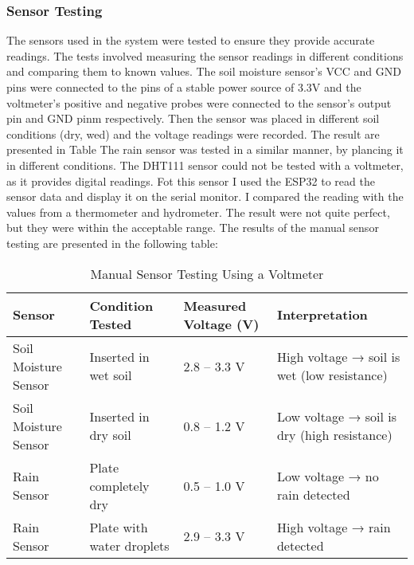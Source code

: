 \subsubsection{Sensor Testing}
The sensors used in the system were tested to ensure they provide accurate readings.
The tests involved measuring the sensor readings in different conditions and comparing them to known values. The soil moisture sensor's VCC 
and GND pins were connected to the pins of a stable power source of 3.3V and the voltmeter's positive and negative probes were connected
to the sensor's output pin and GND pinm respectively. Then the sensor was placed in different soil conditions (dry, wed)
and the voltage readings were recorded. The result are presented in Table
The rain sensor was tested in a similar manner, by plancing it in different conditions.
The DHT111 sensor could not be tested with a voltmeter, as it provides digital readings. Fot this sensor I used 
the ESP32 to read the sensor data and display it on the serial monitor. I compared the reading with the values from a thermometer and hydrometer. The
result were not quite perfect, but they were within the acceptable range.
The results of the manual sensor testing are presented in the following table:
\begin{table}[H]
\centering
\begin{tabular}{|p{4.2cm}|p{5cm}|p{3.5cm}|p{3.5cm}|}
\hline
\textbf{Sensor} & \textbf{Condition Tested} & \textbf{Measured Voltage (V)} & \textbf{Interpretation} \\
\hline
Soil Moisture Sensor & Inserted in wet soil & 2.8 – 3.3 V & High voltage → soil is wet (low resistance) \\
\hline
Soil Moisture Sensor & Inserted in dry soil & 0.8 – 1.2 V & Low voltage → soil is dry (high resistance) \\
\hline
Rain Sensor & Plate completely dry & 0.5 – 1.0 V & Low voltage → no rain detected \\
\hline
Rain Sensor & Plate with water droplets & 2.9 – 3.3 V & High voltage → rain detected \\
\hline
\end{tabular}
\caption{Manual Sensor Testing Using a Voltmeter}
\label{tab:voltmeter_sensor_test}
\end{table}